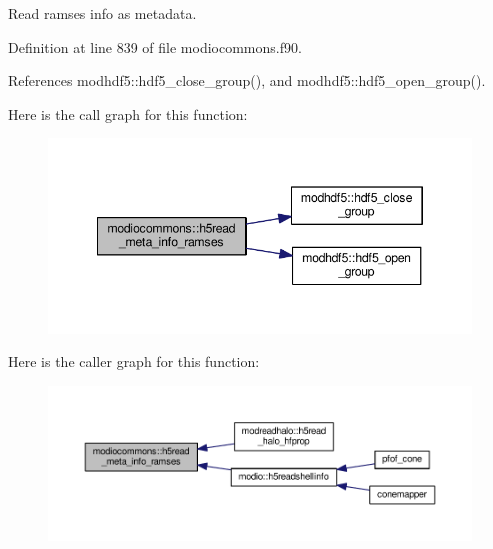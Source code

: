Read ramses info as metadata. 



Definition at line 839 of file modiocommons.\-f90.



References modhdf5\-::hdf5\-\_\-close\-\_\-group(), and modhdf5\-::hdf5\-\_\-open\-\_\-group().



Here is the call graph for this function\-:\nopagebreak
\begin{figure}[H]
\begin{center}
\leavevmode
\includegraphics[width=346pt]{classmodiocommons_a1796f14ec35efbff3a4e692077c8bcf8_cgraph}
\end{center}
\end{figure}




Here is the caller graph for this function\-:\nopagebreak
\begin{figure}[H]
\begin{center}
\leavevmode
\includegraphics[width=350pt]{classmodiocommons_a1796f14ec35efbff3a4e692077c8bcf8_icgraph}
\end{center}
\end{figure}


